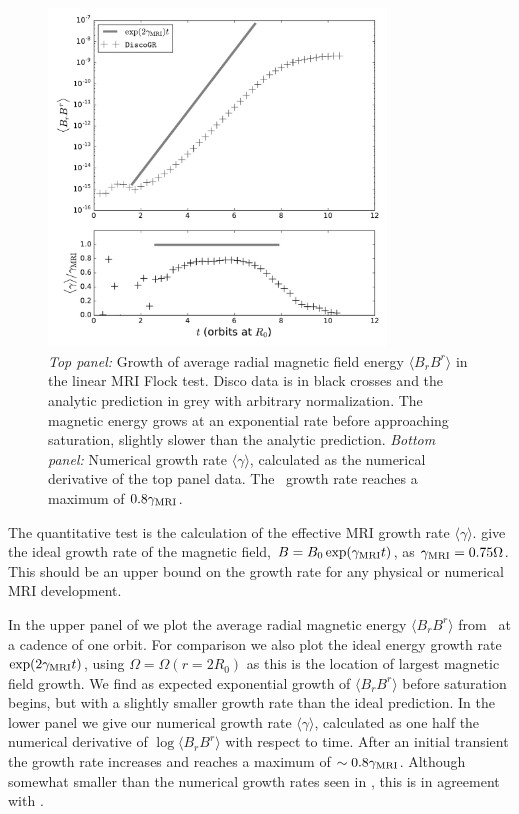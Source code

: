 \begin{figure}
\begin{center}
	\includegraphics[width=0.8\textwidth]{figures/numerics/flock_Br2.pdf}
\end{center}
\caption{\emph{Top panel:} Growth of average radial magnetic field energy $\langle B_r B^r\rangle$ in the linear MRI Flock test.  Disco data is in black crosses and the analytic prediction in grey with arbitrary normalization.  The magnetic energy grows at an exponential rate before approaching saturation, slightly slower than the analytic prediction. \emph{Bottom panel:} Numerical growth rate $\langle \gamma \rangle$, calculated as the numerical derivative of the top panel data. The \grdisco\ growth rate reaches a maximum of $0.8 \gamma_{\rm MRI}$.  }
\end{figure}

The quantitative test is the calculation of the effective MRI growth rate $\langle \gamma \rangle$.  \citet{Flock10} give the ideal growth rate of the magnetic field, $B = B_0 \exp(\gamma_{\rm MRI} t)$, as $\gamma_{\rm MRI} = 0.75 \Omega$.  This should be an upper bound on the growth rate for any physical or numerical MRI development.

 In the upper panel of  we plot the average radial magnetic energy $\langle B_r B^r\rangle$ from \grdisco\ at a cadence of one orbit.  For comparison we also plot the ideal energy growth rate $\exp(2 \gamma_{\rm MRI} t)$, using $\Omega = \Omega(r=2R_0)$ as this is the location of largest magnetic field growth.  We find as expected exponential growth of $\langle B_r B^r\rangle$ before saturation begins, but with a slightly smaller growth rate than the ideal prediction.  In the lower panel we give our numerical growth rate $\langle \gamma \rangle$, calculated as one half the numerical derivative of $\log \langle B_r B^r\rangle$ with respect to time.  After an initial transient the growth rate increases and reaches a maximum of $\sim 0.8 \gamma_{\rm MRI}$.  Although somewhat smaller than the numerical growth rates seen in \citet{Flock10}, this is in agreement with \citet{Duffell16}.

